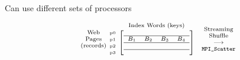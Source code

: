 \begin{frame}
  \begin{block}{Can use different sets of processors}
    \begin{center}
      \begin{equation*}\scriptsize
        \begin{array}{c@{\hspace{-2ex}}r@{\hspace{-2ex}}c}
          \begin{array}{c}
            \mbox{\scriptsize Web} \\
            \mbox{\scriptsize Pages} \\
            \mbox{\scriptsize (records)}
          \end{array} &
          \begin{array}{c}\tiny
            \\ \mbox{\tiny p0} \\ \mbox{\tiny p1} \\
            \mbox{\tiny p2} \\ \mbox{\tiny p3}
          \end{array} &
          \begin{array}{c}
            \mbox{\scriptsize Index Words (keys)} \\
            \left[
            \begin{array}{cccc}
              \\
              \hline
              B_1 & B_2  & B_3 & B_4 \\
              \hline
              \\
              \hline
              \\
            \end{array}
            \right]
          \end{array}
        \end{array}
        \hbox{\hspace{-2ex}}
        \begin{array}{c}
          \hbox{Streaming} \\
          \hbox{Shuffle} \\
          \longrightarrow \\
          \mbox{\code{MPI\_Scatter}}
        \end{array}
        \hbox{\hspace{-2ex}}
        \begin{array}{c@{\hspace{-2ex}}r@{\hspace{-2ex}}c}

\end{array}
\end{equation*}
\end{center}
\end{block}
\end{frame}
